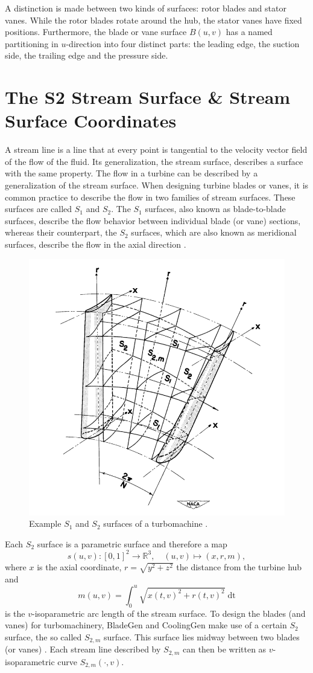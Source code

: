 \documentclass[a4paper, 11pt]{report}
\theoremstyle{definition}
\begin{document}
	A distinction is made between two kinds of surfaces: rotor blades and stator vanes. While the rotor blades rotate around the hub, the stator vanes have fixed positions. Furthermore, the blade or vane surface $B(u,v)$ has a named partitioning in $u$-direction into four distinct parts: the leading edge, the suction side, the trailing edge and the pressure side.

\section{The S2 Stream Surface \& Stream Surface Coordinates}\label{sec:mrtheta}
	A stream line is a line that at every point is tangential to the velocity vector field of the flow of the fluid. Its generalization, the stream surface, describes a surface with the same property. The flow in a turbine can be described by a generalization of the stream surface. When designing turbine blades or vanes, it is common practice to describe the flow in two families of stream surfaces. These surfaces are called $S_1$ and $S_2$. The $S_1$ surfaces, also known as blade-to-blade surfaces, describe the flow behavior between individual blade (or vane) sections, whereas their counterpart, the $S_2$ surfaces, which are also known as meridional surfaces, describe the flow in the axial direction \cite{Wu1952}.

	\begin{figure}[H]
		\centering
		\includegraphics[width=.5\textwidth]{../assets/renamed_wu_naca_s2.png}
		\caption{Example $S_1$ and $S_2$ surfaces of a turbomachine \cite{Wu1952}.}
	\end{figure}
	
	Each $S_2$ surface is a parametric surface and therefore a map
		$$s(u,v) : [0,1]^2 \rightarrow \mathbb{R}^3, \quad (u,v) \mapsto (x, r, m),$$
	where $x$ is the axial coordinate, $r = \sqrt{y^2+z^2}$ the distance from the turbine hub and 
		$$m(u,v) = \int_0^u \sqrt{x(t,v)^2 + r(t,v)^2} \; \textrm{dt}$$
	is the $v$-isoparametric arc length of the stream surface. To design the blades (and vanes) for turbomachinery, BladeGen and CoolingGen make use of a certain $S_2$ surface, the so called $S_{2,m}$ surface. This surface lies midway between two blades (or vanes) \cite{Wu1952}. Each stream line described by $S_{2,m}$ can then be written as $v$-isoparametric curve $S_{2,m}(\cdot, v)$.
\end{document}
